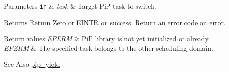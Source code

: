 \begin{DoxyParams}[1]{Parameters}
\mbox{\tt in}  & {\em task} & Target Pi\-P task to switch.\\
\hline
\end{DoxyParams}
\begin{DoxyReturn}{Returns}
Return {\ttfamily Zero} or E\-I\-N\-T\-R on success. Return an error code on error. 
\end{DoxyReturn}

\begin{DoxyRetVals}{Return values}
{\em E\-P\-E\-R\-M} & Pi\-P library is not yet initialized or already \\
\hline
{\em E\-P\-E\-R\-M} & The specified task belongs to the other scheduling domain.\\
\hline
\end{DoxyRetVals}
\begin{DoxySeeAlso}{See Also}
\hyperlink{group__ULP-0-yield_ga50469f21446ce86ea18ddd282cf15894}{pip\-\_\-yield} 
\end{DoxySeeAlso}
